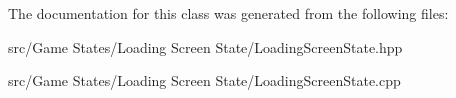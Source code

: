 The documentation for this class was generated from the following files\+:\begin{DoxyCompactItemize}
\item 
src/\+Game States/\+Loading Screen State/Loading\+Screen\+State.\+hpp\item 
src/\+Game States/\+Loading Screen State/Loading\+Screen\+State.\+cpp\end{DoxyCompactItemize}
